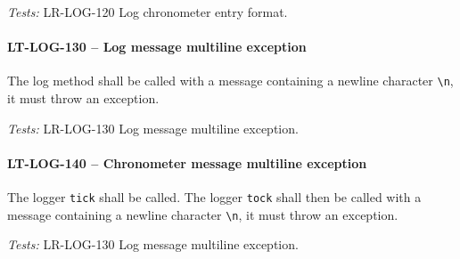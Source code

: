 \textit{Tests: } LR-LOG-120 Log chronometer entry format.

\paragraph{LT-LOG-130 -- Log message multiline exception}
The log method shall be called with a message containing
a newline character \lstinline{\n}, it must throw an exception.

\textit{Tests: } LR-LOG-130 Log message multiline exception.

\paragraph{LT-LOG-140 -- Chronometer message multiline exception}
The logger \lstinline{tick} shall be called.
The logger \lstinline{tock} shall then be called with a message
containing a newline character \lstinline{\n}, it must throw
an exception.

\textit{Tests: } LR-LOG-130 Log message multiline exception.

